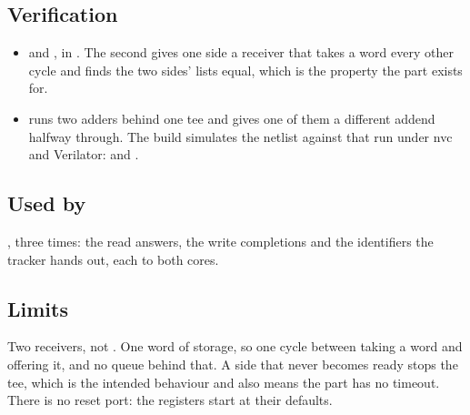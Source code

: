 \subsection*{Verification}

\begin{itemize}
\item {} and
, in
. The second gives one side a receiver
that takes a word every other cycle and finds the two sides' lists
equal, which is the property the part exists for.
\item {} runs two adders behind one
tee and gives one of them a different addend halfway through. The build
simulates the netlist against that run under nvc and Verilator:
 and
.
\end{itemize}

\subsection*{Used by}

, three times: the read answers, the write completions and
the identifiers the tracker hands out, each to both cores.

\subsection*{Limits}

Two receivers, not . One word of storage, so one cycle between
taking a word and offering it, and no queue behind that. A side that
never becomes ready stops the tee, which is the intended behaviour and
also means the part has no timeout. There is no reset port: the
registers start at their defaults.
